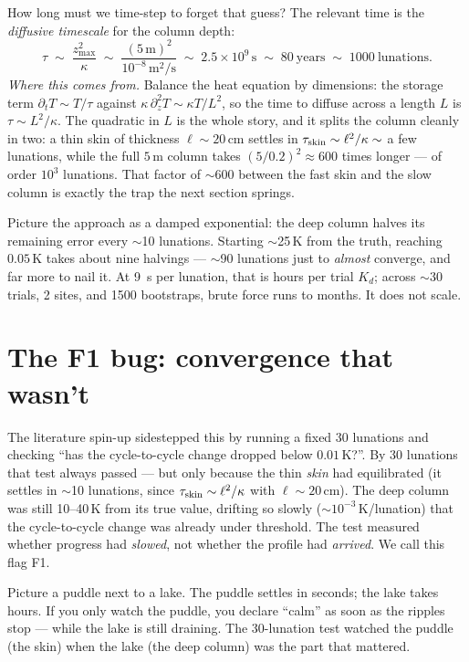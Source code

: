 \documentclass[11pt]{report}
\begin{document}
How long must we time-step to forget that guess? The relevant time is the
\emph{diffusive timescale} for the column depth:
\begin{equation}
\tau \;\sim\; \frac{z_{\max}^2}{\kappa}
\;\sim\; \frac{(5\,\text{m})^2}{10^{-8}\,\text{m}^2/\text{s}}
\;\sim\; 2.5\!\times\!10^{9}\,\text{s}
\;\sim\; 80\ \text{years}
\;\sim\; 1000\ \text{lunations}.
\label{eq:tau}
\end{equation}
\emph{Where this comes from.} Balance the heat equation by dimensions: the
storage term $\partial_t T\sim T/\tau$ against $\kappa\,\partial_z^2 T\sim\kappa
T/L^2$, so the time to diffuse across a length $L$ is $\tau\sim L^2/\kappa$. The
quadratic in $L$ is the whole story, and it splits the column cleanly in two: a
thin skin of thickness $\ell\sim20$\,cm settles in
$\tau_{\rm skin}\sim\ell^2/\kappa\sim$ a few lunations, while the full $5$\,m
column takes $(5/0.2)^2\approx600$ times longer --- of order $10^3$ lunations.
That factor of $\sim$600 between the fast skin and the slow column is exactly the
trap the next section springs.

Picture the approach as a damped exponential: the deep column halves its
remaining error every $\sim$10 lunations. Starting $\sim$25\,K from the truth, reaching $0.05$\,K takes about
nine halvings --- $\sim$90 lunations just to \emph{almost} converge, and far more
to nail it. At 9~s per lunation, that is hours per trial $K_d$; across $\sim$30 trials,
2 sites, and 1500 bootstraps, brute force runs to months. It does not scale.

\section{The F1 bug: convergence that wasn't}\label{sec:f1}

The literature spin-up sidestepped this by running a fixed 30 lunations and
checking ``has the cycle-to-cycle change dropped below $0.01$\,K?''. By 30
lunations that test always passed --- but only because the thin \emph{skin} had
equilibrated (it settles in $\sim$10 lunations, since
$\tau_{\rm skin}\sim\ell^2/\kappa$ with $\ell\!\sim\!20$\,cm). The deep column
was still 10--40\,K from its true value, drifting so slowly
($\sim$$10^{-3}$\,K/lunation) that the cycle-to-cycle change was already under
threshold. The test measured whether progress had \emph{slowed}, not whether the
profile had \emph{arrived}. We call this flag F1.

\begin{plain}
Picture a puddle next to a lake. The puddle settles in seconds; the lake takes
hours. If you only watch the puddle, you declare ``calm'' as soon as the ripples
stop --- while the lake is still draining. The 30-lunation test watched the
puddle (the skin) when the lake (the deep column) was the part that mattered.
\end{plain}
\end{document}
